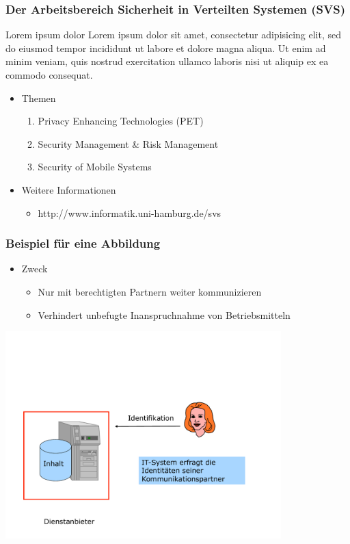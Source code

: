 \documentclass[t]{beamer}
\begin{document}
\begin{frame}
	\frametitle{Der Arbeitsbereich Sicherheit in Verteilten Systemen (SVS)}
	\begin{block}{Lorem ipsum dolor}
		Lorem ipsum dolor sit amet, consectetur adipisicing elit, sed do eiusmod tempor incididunt ut labore et dolore magna aliqua. Ut enim ad minim veniam, quis nostrud exercitation ullamco laboris nisi ut aliquip ex ea commodo consequat.
	\end{block}
	\begin{itemize}
		\item Themen
			\begin{enumerate}
				\item Privacy Enhancing Technologies (PET)
				\item Security Management \& Risk Management
				\item Security of Mobile Systems
			\end{enumerate}
		\item Weitere Informationen
			\begin{itemize}
				\item http://www.informatik.uni-hamburg.de/svs
			\end{itemize}
	\end{itemize}
\end{frame}


\begin{frame}
	\frametitle{Beispiel für eine Abbildung}
	\begin{itemize}
		\item Zweck
			\begin{itemize}
				\item Nur mit \alert{berechtigten Partnern} weiter kommunizieren
				\item Verhindert unbefugte Inanspruchnahme von Betriebsmitteln
			\end{itemize}
	\end{itemize}
	\vspace{\fill}
	\pause %
	\begin{center}
		\includegraphics[width=0.8\textwidth]{pic/abbildung1.pdf}
	\end{center}
\end{frame}
\end{document}
